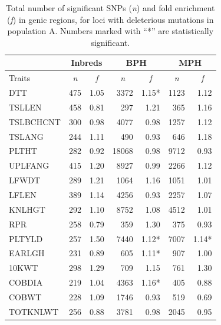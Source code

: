 \documentclass[12pt]{article}
\begin{document}
\begin{table}[!t]
  \begin{center}

    \caption[]{Total number of significant SNPs (\emph{n}) and fold enrichment (\emph{f}) in genic regions, for loci with deleterious mutations in population A. Numbers marked with ``*'' are statistically significant.}
{\fontsize{10}{10}\sf
      \begin{tabular}{l|rr|rr|rr} 
\toprule
\multicolumn{1}{c}{}	&	\multicolumn{2}{c}{Inbreds}	&	\multicolumn{2}{c}{BPH}	&	\multicolumn{2}{c}{MPH}	\\	\hline 
Traits	& 	\multicolumn{1}{c}{\emph{n}} 	& 	\multicolumn{1}{c|}{\emph{f}}	& \multicolumn{1}{c}{\emph{n}} 	& 	\multicolumn{1}{c}{\emph{f}} 		& \multicolumn{1}{c}{\emph{n}} 	& 	\multicolumn{1}{c}{\emph{f}} 		\\	\hline \hline  
DTT 	& 	475 	& 	1.05 	& 	3372 	& 	1.15* 	& 	1123 	& 	1.12	\\
TSLLEN 	& 	458 	& 	0.81 	& 	297 	& 	1.21 	& 	365 	& 	1.16	\\
TSLBCHCNT 	& 	300 	& 	0.98 	& 	4077 	& 	0.98 	& 	1257 	& 	1.12	\\
TSLANG 	& 	244 	& 	1.11 	& 	490 	& 	0.93 	& 	646 	& 	1.18	\\
PLTHT 	& 	282 	& 	0.92 	& 	18068 	& 	0.98 	& 	9712 	& 	0.93	\\
UPLFANG 	& 	415 	& 	1.20 	& 	8927 	& 	0.99 	& 	2266 	& 	1.12	\\
LFWDT 	& 	289 	& 	1.21 	& 	1064 	& 	1.16 	& 	1051 	& 	1.01	\\
LFLEN 	& 	389 	& 	1.14 	& 	4256 	& 	0.93 	& 	2257 	& 	1.07	\\
KNLHGT 	& 	292 	& 	1.10 	& 	8752 	& 	1.08 	& 	4512 	& 	1.01	\\
RPR 	& 	258 	& 	0.79 	& 	359 	& 	1.30 	& 	375 	& 	0.93	\\
PLTYLD 	& 	257 	& 	1.50 	& 	7440 	& 	1.12* 	& 	7007 	& 	1.14*	\\
EARLGH 	& 	231 	& 	0.89 	& 	605 	& 	1.11* 	& 	907 	& 	1.00	\\	
10KWT 	& 	298 	& 	1.29 	& 	709 	& 	1.15 	& 	761 	& 	1.30	\\
COBDIA 	& 	219 	& 	1.04 	& 	4363 	& 	1.16* 	& 	405 	& 	0.88	\\
COBWT 	& 	228 	& 	1.09 	& 	1746 	& 	0.93 	& 	519 	& 	0.69	\\
TOTKNLWT 	& 	256 	& 	0.88 	& 	3781 	& 	0.98 	& 	2045 	& 	0.95	\\
\bottomrule
      \end{tabular}
}
    \label{popA_sig_enrichment}  
  \end{center}
\end{table}
\end{document}
